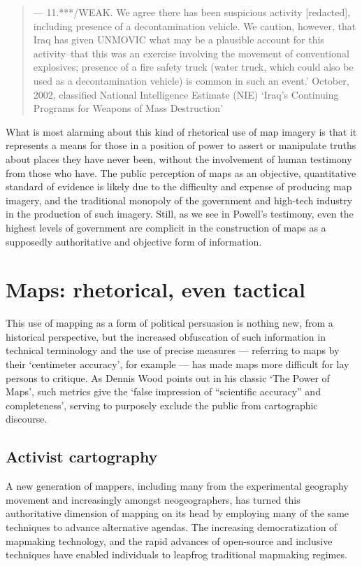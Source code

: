 \documentclass[11pt,oneside,notitlepage]{report}
\begin{document}
{{\begin{quote}
--- 11.***/WEAK. We agree there has been suspicious activity [redacted], including presence of a decontamination vehicle. We caution, however, that Iraq has given UNMOVIC what may be a plausible account for this activity--that this was an exercise involving the movement of conventional explosives; presence of a fire safety truck (water truck, which could also be used as a decontamination vehicle) is common in such an event.'
	October, 2002, classified National Intelligence Estimate (NIE) `Iraq's Continuing Programs for Weapons of Mass Destruction' \cite{senate2004report}
\end{quote} 

What is most alarming about this kind of rhetorical use of map imagery is that it represents a means for those in a position of power to assert or manipulate truths about places they have never been, without the involvement of human testimony from those who have. The public perception of maps as an objective, quantitative standard of evidence is likely due to the difficulty and expense of producing map imagery, and the traditional monopoly of the government and high-tech industry in the production of such imagery. Still, as we see in Powell's testimony, even the highest levels of government are complicit in the construction of maps as a supposedly authoritative and objective form of information.

\section{Maps: rhetorical, even tactical}

This use of mapping as a form of political persuasion is nothing new, from a historical perspective, but the increased obfuscation of such information in technical terminology and the use of precise measures --- referring to maps by their `centimeter accuracy', for example --- has made maps more difficult for lay persons to critique. As Dennis Wood points out in his classic `The Power of Maps', such metrics give the `false impression of ``scientific accuracy'' and completeness', serving to purposely exclude the public from cartographic discourse. \cite{wood1992power}

\subsection{Activist cartography}

A new generation of mappers, including many from the experimental geography movement and increasingly amongst neogeographers, has turned this authoritative dimension of mapping on its head by employing many of the same techniques to advance alternative agendas. The increasing democratization of mapmaking technology, and the rapid advances of open-source and inclusive techniques have enabled individuals to leapfrog traditional mapmaking regimes. 

}}
\end{document}

